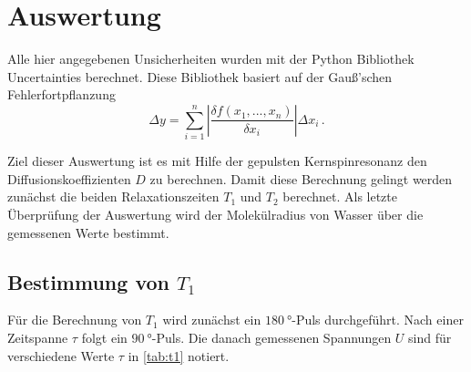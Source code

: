 \section{Auswertung}
\label{sec:Auswertung}

Alle hier angegebenen Unsicherheiten wurden mit der Python Bibliothek Uncertainties berechnet.\cite{uncertainties}
Diese Bibliothek basiert auf der Gauß'schen Fehlerfortpflanzung
\begin{equation}
    \Delta y = \sum_{i=1}^n \left| \frac{\delta f(x_1,...,x_n)}{\delta x_i} \right| \Delta x_i \, .
    \label{eq:fehlerrechnung}
\end{equation}

Ziel dieser Auswertung ist es mit Hilfe der gepulsten Kernspinresonanz den Diffusionskoeffizienten $D$ zu berechnen. 
Damit diese Berechnung gelingt werden zunächst die beiden Relaxationszeiten $T_1$ und $T_2$ berechnet.
Als letzte Überprüfung der Auswertung wird der Molekülradius von Wasser über die gemessenen Werte bestimmt.

\subsection{Bestimmung von \texorpdfstring{$T_1$}{T1}}
\label{ssec:aus1}

Für die Berechnung von $T_1$ wird zunächst ein $\SI{180}{\degree}$-Puls durchgeführt.
Nach einer Zeitspanne $\tau$ folgt ein $\SI{90}{\degree}$-Puls. 
Die danach gemessenen Spannungen $U$ sind für verschiedene Werte $\tau$ in \autoref{tab:t1} notiert. 

